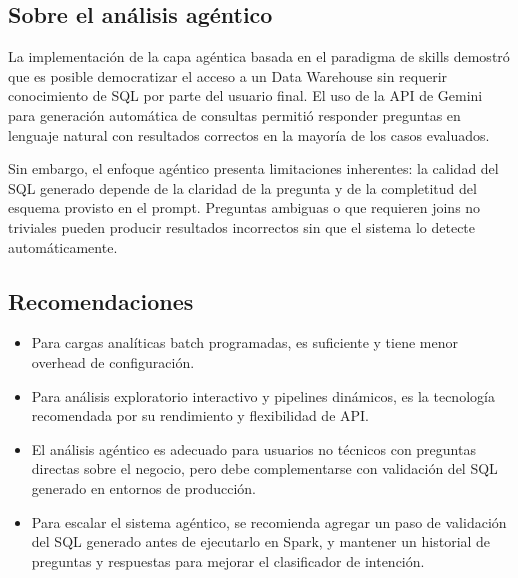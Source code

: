 \subsection{Sobre el análisis agéntico}

La implementación de la capa agéntica basada en el paradigma de skills demostró que
es posible democratizar el acceso a un Data Warehouse sin requerir conocimiento de SQL
por parte del usuario final. El uso de la API de Gemini para generación automática de
consultas permitió responder preguntas en lenguaje natural con resultados correctos
en la mayoría de los casos evaluados.

Sin embargo, el enfoque agéntico presenta limitaciones inherentes: la calidad del SQL
generado depende de la claridad de la pregunta y de la completitud del esquema provisto
en el prompt. Preguntas ambiguas o que requieren joins no triviales pueden producir
resultados incorrectos sin que el sistema lo detecte automáticamente.

\subsection{Recomendaciones}

\begin{itemize}[noitemsep]
    \item Para cargas analíticas batch programadas, \hive{} es suficiente y tiene
          menor overhead de configuración.
    \item Para análisis exploratorio interactivo y pipelines dinámicos, \spark{} es
          la tecnología recomendada por su rendimiento y flexibilidad de API.
    \item El análisis agéntico es adecuado para usuarios no técnicos con preguntas
          directas sobre el negocio, pero debe complementarse con validación del SQL
          generado en entornos de producción.
    \item Para escalar el sistema agéntico, se recomienda agregar un paso de validación
          del SQL generado antes de ejecutarlo en Spark, y mantener un historial de
          preguntas y respuestas para mejorar el clasificador de intención.
\end{itemize}
